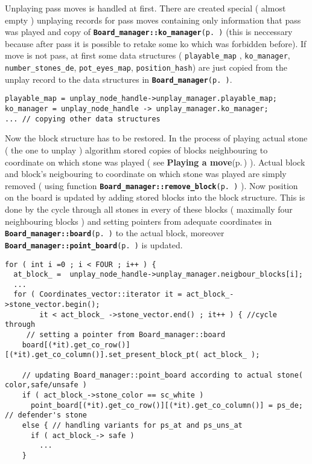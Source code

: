 Unplaying pass moves is handled at first. There are created special ( almost empty ) unplaying records for pass moves containing only information that pass was played and copy of {\tt {\bf Board\_\-manager::ko\_\-manager}{\rm (p.\,\pageref{classBoard__manager_o3})}} (this is neccessary because after pass it is possible to retake some ko which was forbidden before). If move is not pass, at first some data structures ( {\tt playable\_\-map} , {\tt ko\_\-manager}, {\tt number\_\-stones\_\-de}, {\tt pot\_\-eyes\_\-map}, {\tt position\_\-hash}) are just copied from the unplay record to the data structures in {\tt {\bf Board\_\-manager}{\rm (p.\,\pageref{classBoard__manager})}}. 

\footnotesize\begin{verbatim}playable_map = unplay_node_handle->unplay_manager.playable_map; 
ko_manager = unplay_node_handle -> unplay_manager.ko_manager;
... // copying other data structures
\end{verbatim}
\normalsize


Now the block structure has to be restored. In the process of playing actual stone ( the one to unplay ) algorithm stored copies of blocks neighbouring to coordinate on which stone was played ( see {\bf Playing a move}{\rm (p.\,\pageref{page_6_page_6__sec_3})} ). Actual block and block's neigbouring to coordinate on which stone was played are simply removed ( using function {\tt {\bf Board\_\-manager::remove\_\-block}{\rm (p.\,\pageref{classBoard__manager_a3})}} ). Now position on the board is updated by adding stored blocks into the block structure. This is done by the cycle through all stones in every of these blocks ( maximally four neighbouring blocks ) and setting pointers from adequate coordinates in {\tt {\bf Board\_\-manager::board}{\rm (p.\,\pageref{classBoard__manager_r1})}} to the actual block, moreover {\tt {\bf Board\_\-manager::point\_\-board}{\rm (p.\,\pageref{classBoard__manager_o5})}} is updated. 

\footnotesize\begin{verbatim}for ( int i =0 ; i < FOUR ; i++ ) {
  at_block_ =  unplay_node_handle->unplay_manager.neigbour_blocks[i];
  ... 
  for ( Coordinates_vector::iterator it = act_block_->stone_vector.begin(); 
        it < act_block_ ->stone_vector.end() ; it++ ) { //cycle through
     // setting a pointer from Board_manager::board  
    board[(*it).get_co_row()][(*it).get_co_column()].set_present_block_pt( act_block_ );
    
    // updating Board_manager::point_board according to actual stone( color,safe/unsafe )
    if ( act_block_->stone_color == sc_white )  
      point_board[(*it).get_co_row()][(*it).get_co_column()] = ps_de; // defender's stone
    else { // handling variants for ps_at and ps_uns_at 
      if ( act_block_-> safe ) 
        ...
    }
\end{verbatim}
\normalsize


